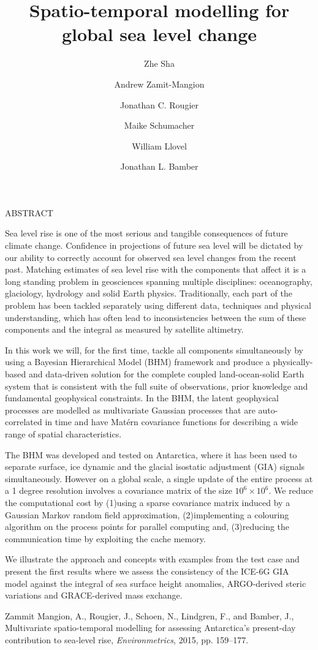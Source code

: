\documentclass[12pt]{article}
\title{Spatio-temporal modelling for global sea level change}
\date{}
\author[1]{Zhe Sha}
\author[2]{Andrew Zamit-Mangion}
\author[1]{Jonathan C. Rougier}
\author[1]{Maike Schumacher}
\author[1]{William Llovel}
\author[1]{Jonathan L. Bamber}
\affil[1]{University of Bristol, UK, zhe.sha@bristol.ac.uk}
\affil[2]{University of Wollongong, Australia}
\renewenvironment{abstract}[0]{\small\rm
        \begin{center}ABSTRACT
        \\ \vspace{8pt}
        \begin{minipage}{5.3in}
        \hspace{1pc}}{\end{minipage}\end{center}\vspace{-1pt}}
\begin{document}
\maketitle

\begin{abstract}
Sea level rise is one of the most serious and tangible consequences of future climate change. Confidence in projections of future sea level will be dictated by our ability to correctly account for observed sea level changes from the recent past. Matching estimates of sea level rise with the components that affect it is a long standing problem in geosciences spanning multiple disciplines: oceanography, glaciology, hydrology and solid Earth physics. Traditionally, each part of the problem has been tackled separately using different data, techniques and physical understanding, which has often lead to inconsistencies between the sum of these components and the integral as measured by satellite altimetry. 

In this work we will, for the first time, tackle all components simultaneously by using a Bayesian Hierarchical Model (BHM) framework and produce a physically-based and data-driven solution for the complete coupled land-ocean-solid Earth system that is consistent with the full suite of observations, prior knowledge and fundamental geophysical constraints.  In the BHM, the latent geophysical processes are modelled as multivariate Gaussian processes that are auto-correlated in time and have Mat\'ern covariance functions for describing a wide range of spatial characteristics.


The BHM was developed and tested on Antarctica\cite{azm}, where it has been used to separate surface, ice dynamic and the glacial isostatic adjustment (GIA) signals simultaneously. However on a global scale, a single update of the entire process at a 1 degree resolution involves a covariance matrix of the size $10^6 \times 10^6$. We reduce the computational cost by (1)using a sparse covariance matrix induced by a Gaussian Markov random field approximation, (2)implementing a colouring algorithm on the process points for parallel computing and, (3)reducing the communication time by exploiting the cache memory. 

We illustrate the approach and concepts with examples from the test case and present the first results where we assess the consistency of the ICE-6G GIA model against the integral of sea surface height anomalies, ARGO-derived steric variations and GRACE-derived mass exchange.




\end{abstract}

\begin{thebibliography}{99}
\small
{} Zammit Mangion, A., Rougier, J., Schoen, N., Lindgren, F., and Bamber, J., Multivariate spatio-temporal modelling for assessing Antarctica's present-day contribution to sea-level rise, \emph{Environmetrics}, 2015, pp. 159--177.


\end{thebibliography}
\end{document}
